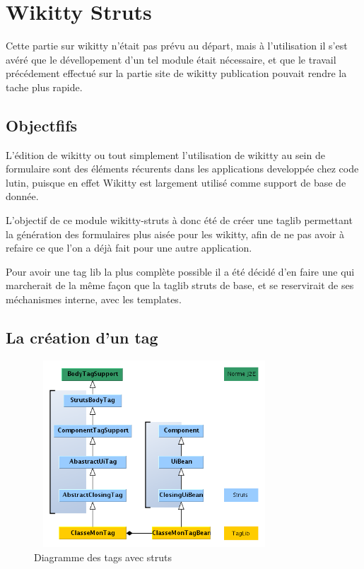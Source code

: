 \section{Wikitty Struts}

Cette partie sur wikitty n'était pas prévu au départ, mais à l'utilisation
il s'est avéré que le dévellopement d'un tel module était nécessaire, et que
le travail précédement effectué sur la partie site de wikitty publication
pouvait rendre la tache plus rapide.


\subsection{Objectfifs}

L'édition de wikitty ou tout simplement l'utilisation de wikitty au sein de 
formulaire sont des éléments récurents dans les applications developpée 
chez code lutin, puisque en effet Wikitty est largement utilisé comme support
de base de donnée. 

L'objectif de ce module wikitty-struts à donc été de créer une taglib permettant
la génération des formulaires plus aisée pour les wikitty, afin de ne pas 
avoir à refaire ce que l'on a déjà fait pour une autre application.

Pour avoir une tag lib la plus complète possible il a été décidé d'en faire une
qui marcherait de la même façon que la taglib struts de base, et se reservirait
de ses méchanismes interne, avec les templates.

\subsection{La création d'un tag}

\begin{figure}[!ht]
\centering
\includegraphics[height=7cm,width=9cm]{image/explicationTag.png}
  		\caption{Diagramme des tags avec struts}
  		\label{diagtagstruts}
\end{figure}

